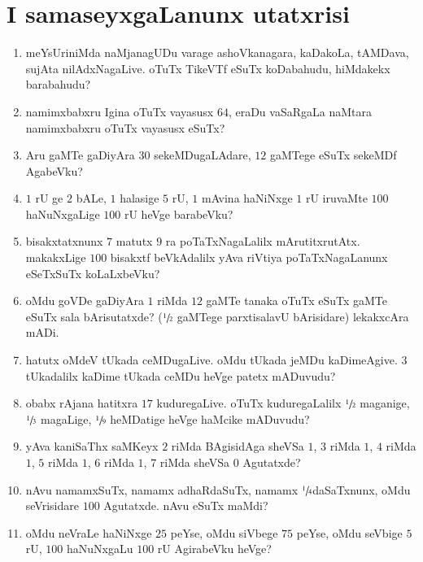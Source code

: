 \chapter{I samaseyxgaLanunx utatxrisi}

\begin{enumerate}
  \renewcommand{\labelenumi}{\rm(\theenumi)}
  \itemsep=2pt
\item meYsUriniMda naMjanagUDu varage ashoVkanagara, kaDakoLa, tAMDava, sujAta nilAdxNagaLive. oTuTx TikeVTf eSuTx koDabahudu, hiMdakekx barabahudu?

\item namimxbabxru Igina oTuTx vayasusx $64$, eraDu vaSaRgaLa naMtara namimxbabxru oTuTx vayasusx eSuTx?

\item Aru gaMTe gaDiyAra $30$ sekeMDugaLAdare, $12$ gaMTege eSuTx sekeMDf AgabeVku?

\item $1$ rU ge $2$ bALe, $1$ halasige $5$ rU, $1$ mAvina haNiNxge $1$ rU iruvaMte $100$ haNuNxgaLige $100$ rU heVge barabeVku?

\item bisakxtatxnunx $7$ matutx $9$ ra poTaTxNagaLalilx mArutitxrutAtx. makakxLige $100$ bisakxtf beVkAdalilx yAva riVtiya poTaTxNagaLanunx eSeTxSuTx koLaLxbeVku?

\item oMdu goVDe gaDiyAra $1$ riMda $12$ gaMTe tanaka oTuTx eSuTx gaMTe eSuTx sala bArisutatxde? ($\sfrac{1}{2}$ gaMTege parxtisalavU bArisidare) lekakxcAra mADi.

\item hatutx oMdeV tUkada ceMDugaLive. oMdu tUkada jeMDu kaDimeAgive. $3$ tUkadalilx kaDime tUkada ceMDu heVge patetx mADuvudu?

\item obabx rAjana hatitxra $17$ kuduregaLive. oTuTx kuduregaLalilx $\sfrac{1}{2}$ maganige, $\sfrac{1}{3}$ magaLige, $\sfrac{1}{9}$ heMDatige heVge haMcike mADuvudu?

\item yAva kaniSaThx saMKeyx $2$ riMda BAgisidAga sheVSa $1$, $3$ riMda $1$, $4$ riMda $1$, $5$ riMda $1$, $6$ riMda $1$, $7$ riMda sheVSa $0$ Agutatxde?

\item nAvu namamxSuTx, namamx adhaRdaSuTx, namamx $\sfrac{1}{4}$daSaTxnunx, oMdu seVrisidare $100$ Agutatxde. nAvu eSuTx maMdi?

\item oMdu neVraLe haNiNxge $25$ peYse, oMdu siVbege $75$ peYse, oMdu seVbige $5$ rU, $100$ haNuNxgaLu $100$ rU AgirabeVku heVge?


\end{enumerate}
